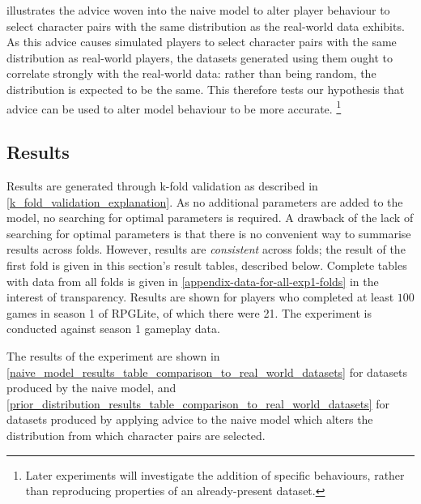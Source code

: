  illustrates the advice woven into the
naive model to alter player behaviour to select character pairs with the same
distribution as the real-world data exhibits. As this advice causes simulated
players to select character pairs with the same distribution as real-world
players, the datasets generated using them ought to correlate strongly with the
real-world data: rather than being random, the distribution is expected to be
the same. This therefore tests our hypothesis that advice can be used to alter
model behaviour to be more accurate.
\footnote{
  Later experiments will investigate the addition of specific behaviours, rather
  than reproducing properties of an already-present dataset.
}


\subsection{Results}

Results are generated through k-fold validation as described in
\cref{k_fold_validation_explanation}. As no additional parameters are added to
the model, no searching for optimal parameters is required. A drawback of the
lack of searching for optimal parameters is that there is no convenient way to
summarise results across folds. However, results are \emph{consistent} across
folds; the result of the first fold is given in this section's result tables,
described below. Complete tables with data from all folds is given in
\cref{appendix-data-for-all-exp1-folds} in the interest of transparency. Results
are shown for players who completed at least $100$ games in season 1 of RPGLite,
of which there were 21. The experiment is conducted against season 1 gameplay
data.

The results of the experiment are shown in
\cref{naive_model_results_table_comparison_to_real_world_datasets} for datasets
produced by the naive model, and
\cref{prior_distribution_results_table_comparison_to_real_world_datasets} for
datasets produced by applying advice to the naive model which alters the
distribution from which character pairs are selected.

